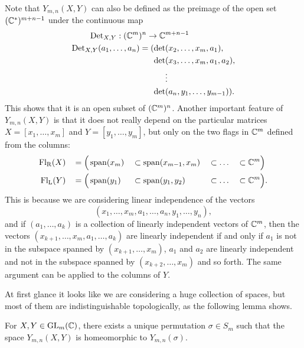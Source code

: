 Note that $Y_{m,n}(X,Y)$ can also be defined as the
preimage of the open set $(\mathbb{C}^*)^{m+n-1}$ under the continuous map
\begin{align*}
  \operatorname{Det}_{X,Y} : (\mathbb{C}^m)^n \to \mathbb{C}&^{m+n-1} \\
  \operatorname{Det}_{X,Y}(a_1,\dots,a_n) = (\det&(x_2,\dots,x_m,a_1),\\
  \det&(x_3,\dots,x_m,a_1,a_2), \\
                              &\vdots\\
  \det&(a_n,y_1,\dots,y_{m-1})).
\end{align*}
This shows that it is an open subset of $(\mathbb{C}^m)^n$. Another important
feature of $Y_{m,n}(X,Y)$ is that it does not really depend on the
particular matrices $X = [x_1,\dots,x_m]$ and $Y = [y_1,\dots,y_m]$,
but
only on the two flags in $\mathbb{C}^{m}$ 
defined from the columns: 
\begin{alignat*}{5}
  \mathrm{Fl_R}(X)\, &&= \Big(&\operatorname{span}(x_m) &&\subset \operatorname{span}(x_{m-1},x_m) &&\subset
  \dots &&\subset \mathbb{C}^m\Big) \\
  \mathrm{Fl_L}(Y)\, &&= \Big(&\operatorname{span}(y_1) &&\subset \operatorname{span}(y_1,y_2) &&\subset
  \dots &&\subset \mathbb{C}^m\Big).
\end{alignat*}
This is because we are considering linear independence of the vectors
\[ (x_1,\dots,x_m,a_1,\dots,a_n,y_1,\dots,y_n), \]
and if $(a_1,\dots,a_{k})$ is a collection of linearly independent
vectors of $\mathbb{C}^m$, then the vectors
$(x_{k+1},\dots,x_m,a_1,\dots,a_{k})$ are
linearly independent if and only if $a_1$ is not in the subspace
spanned by $(x_{k+1},\dots,x_m)$, $a_1$ and $a_2$ are linearly
independent and not in the
subspace spanned by $(x_{k+2},\dots,x_m)$ and so forth. The same
argument can be applied to the columns of $Y$.

At first glance it looks like we are considering a huge collection of
spaces, but most of them are indistinguishable topologically, as the
following lemma shows.

\begin{lemma} \label{lem:rum-perm}
  For $X,Y\in \mathrm{GL}_m(\mathbb{C})$, there exists a unique permutation $\sigma
  \in S_m$  such that the space
  $Y_{m,n}(X,Y)$ is homeomorphic to $Y_{m,n}(\sigma)$.
\end{lemma}

